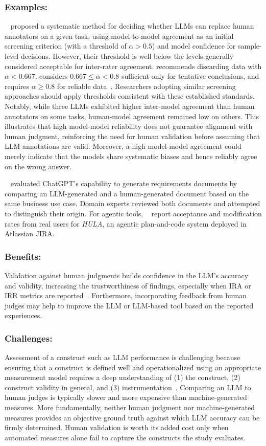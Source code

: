 \documentclass[smallextended]{svjour3}
\newcommand{\guidelinesubsubsection}[1]{\subsubsection{\bfseries #1:}}
\newcommand{\guidelinesubsubsection}[1]{\subsubsection{#1}}
\begin{document}
\guidelinesubsubsection{Examples}

\citeauthor{DBLP:conf/msr/AhmedDTP25}~\cite{DBLP:conf/msr/AhmedDTP25} proposed a systematic method for deciding whether LLMs can replace human annotators on a given task, using model-to-model agreement as an initial screening criterion (with a threshold of $\alpha>0.5$) and model confidence for sample-level decisions. However, their threshold is well below the levels generally considered acceptable for inter-rater agreement.
\citeauthor{Krippendorff2018} recommends discarding data with $\alpha<0.667$, considers $0.667 \leq \alpha < 0.8$ sufficient only for tentative conclusions, and requires $\alpha \geq 0.8$ for reliable data~\cite{Krippendorff2018}. Researchers adopting similar screening approaches should apply thresholds consistent with these established standards. Notably, while three LLMs exhibited higher inter-model agreement than human annotators on some tasks, human-model agreement remained low on others.
This illustrates that high model-model reliability does not guarantee alignment with human judgment, reinforcing the need for human validation before assuming that LLM annotations are valid.
Moreover, a high model-model agreement could merely indicate that the models share systematic biases and hence reliably agree on the wrong answer.

\citeauthor{DBLP:journals/corr/abs-2501-19297}~\cite{DBLP:journals/corr/abs-2501-19297} evaluated ChatGPT's capability to generate requirements documents by comparing an LLM-generated and a human-generated document based on the same business use case. Domain experts reviewed both documents and attempted to distinguish their origin.
For agentic tools, \citeauthor{DBLP:conf/icse-seip/TakerngsaksiriPTTZJLCCW25}~\cite{DBLP:conf/icse-seip/TakerngsaksiriPTTZJLCCW25} report acceptance and modification rates from real users for \emph{HULA}, an agentic plan-and-code system deployed in Atlassian JIRA.

\guidelinesubsubsection{Benefits}

Validation against human judgments builds confidence in the LLM's accuracy and validity, increasing the trustworthiness of findings, especially when IRA or IRR metrics are reported~\cite{khraisha2024canlargelanguagemodelshumans}. Furthermore, incorporating feedback from human judges may help to improve the LLM or LLM-based tool based on the reported experiences.

\guidelinesubsubsection{Challenges}

Assessment of a construct such as LLM performance is challenging because ensuring that a construct is defined well and operationalized using an appropriate measurement model requires a deep understanding of (1) the construct, (2) construct validity in general, and (3) instrumentation~\cite{DBLP:journals/tse/SjobergB23,DBLP:books/sp/24/RalphKAA24}. Comparing an LLM to human judges is typically slower and more expensive than machine-generated measures. More fundamentally, neither human judgment nor machine-generated measures provides an objective ground truth against which LLM accuracy can be firmly determined. Human validation is worth its added cost only when automated measures alone fail to capture the constructs the study evaluates.
\end{document}
